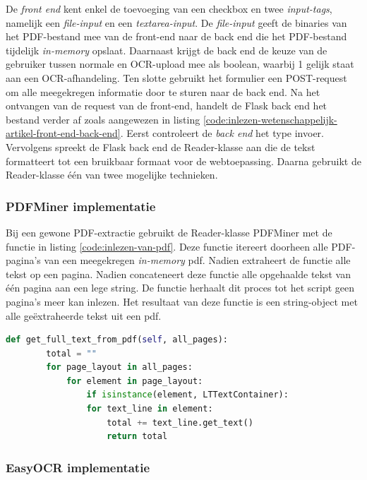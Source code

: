 De \textit{front end} kent enkel de toevoeging van een checkbox en twee \textit{input-tags}, namelijk een \textit{file-input} en een \textit{textarea-input}. De \textit{file-input} geeft de binaries van het PDF-bestand mee van de front-end naar de back end die het PDF-bestand tijdelijk \textit{in-memory} opslaat. Daarnaast krijgt de back end de keuze van de gebruiker tussen normale en OCR-upload mee als boolean, waarbij 1 gelijk staat aan een OCR-afhandeling. Ten slotte gebruikt het formulier een POST-request om alle meegekregen informatie door te sturen naar de back end. Na het ontvangen van de request van de front-end, handelt de Flask back end het bestand verder af zoals aangewezen in listing \ref{code:inlezen-wetenschappelijk-artikel-front-end-back-end}. Eerst controleert de \textit{back end} het type invoer. Vervolgens spreekt de Flask back end de Reader-klasse aan die de tekst formatteert tot een bruikbaar formaat voor de webtoepassing. Daarna gebruikt de Reader-klasse één van twee mogelijke technieken. 

\subsubsection{PDFMiner implementatie}

Bij een gewone PDF-extractie gebruikt de Reader-klasse PDFMiner met de functie in listing \ref{code:inlezen-van-pdf}. Deze functie itereert doorheen alle PDF-pagina's van een meegekregen \textit{in-memory} pdf. Nadien extraheert de functie alle tekst op een pagina. Nadien concateneert deze functie alle opgehaalde tekst van één pagina aan een lege string. De functie herhaalt dit proces tot het script geen pagina's meer kan inlezen. Het resultaat van deze functie is een string-object met alle geëxtraheerde tekst uit een pdf.

\begin{lstlisting}[language=Python, caption={Een PDF inlezen met PDFMiner}, label={code:inlezen-van-pdf}]
	def get_full_text_from_pdf(self, all_pages):
		total = ""
		for page_layout in all_pages:
			for element in page_layout:
				if isinstance(element, LTTextContainer):
				for text_line in element:
					total += text_line.get_text()
					return total
\end{lstlisting}

\subsubsection{EasyOCR implementatie}

